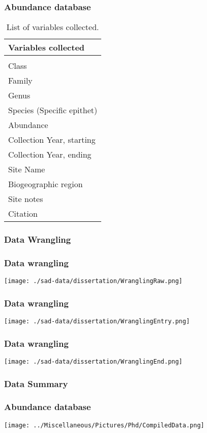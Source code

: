 \documentclass[14pt]{beamer}
\begin{document}
\begin{frame}[shrink=30]
\frametitle{Abundance database}
\begin{table}
\begin{tabular}{l} 
 Variables collected\\ 
\hline
\\
 Class \\
 Family\\
 Genus \\
 Species (Specific epithet)\\
 Abundance \\
 Collection Year, starting\\
 Collection Year, ending \\
 Site Name \\
 Biogeographic region \\
 Site notes\\
 Citation\\ 
\end{tabular}
\caption{List of variables collected.}
\end{table}
\end{frame}

\subsubsection{Data Wrangling}
\begin{frame}[t]
\frametitle{Data wrangling}
\begin{center}
\texttt{[image: ./sad-data/dissertation/WranglingRaw.png]}
\end{center}
\end{frame}

\begin{frame}[t]
\frametitle{Data wrangling}
\begin{center}
\texttt{[image: ./sad-data/dissertation/WranglingEntry.png]}
\end{center}
\end{frame}

\begin{frame}[t]
\frametitle{Data wrangling}
\begin{center}
\texttt{[image: ./sad-data/dissertation/WranglingEnd.png]}
\end{center}
\end{frame}

\subsubsection{Data Summary}
\begin{frame}{}
\frametitle{Abundance database}
\texttt{[image: ../Miscellaneous/Pictures/Phd/CompiledData.png]}
\end{frame}
\end{document}

